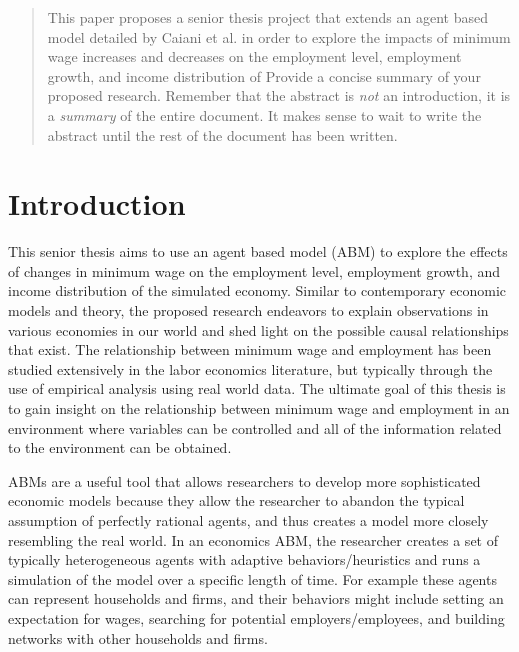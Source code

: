 \documentclass[11pt]{article}
\begin{document}
\begin{quote}

  This paper proposes a senior thesis project that extends an agent based model
  detailed by Caiani et al. in order to explore the impacts of minimum wage increases
  and decreases on the employment level, employment growth, and income distribution
  of 
  Provide a concise summary of your proposed research. Remember that the abstract
  is {\it not\/} an introduction, it is a {\it summary\/} of the entire document.
  It makes sense to wait to write the abstract until the rest of the document has
  been written.

\end{quote}

\section{Introduction}
\label{sec:introduction}


This senior thesis aims to use an agent based model (ABM) to explore the effects
of changes in minimum wage on the employment level, employment growth, and income
distribution of the simulated economy.  Similar to contemporary economic models
and theory, the proposed research endeavors to explain observations in various
economies in our world and shed light on the possible causal relationships that
exist. The relationship between minimum wage and employment has been studied
extensively in the labor economics literature, but typically through the use
of empirical analysis using real world data. The ultimate goal of this thesis
is to gain insight on the relationship between minimum wage and employment in
an environment where variables can be controlled and all of the information
related to the environment can be obtained.

ABMs are a useful tool that allows researchers to develop more sophisticated
economic models because they allow the researcher to abandon the typical assumption
of perfectly rational agents, and thus creates a model more closely resembling
the real world. In an economics ABM,  the researcher creates a set of typically
 heterogeneous agents with adaptive behaviors/heuristics and runs a simulation
 of the model over a specific length of time. For example these agents can
 represent households and firms, and their behaviors might include setting an
 expectation for wages, searching for potential employers/employees, and building
 networks with other households and firms.
\end{document}
